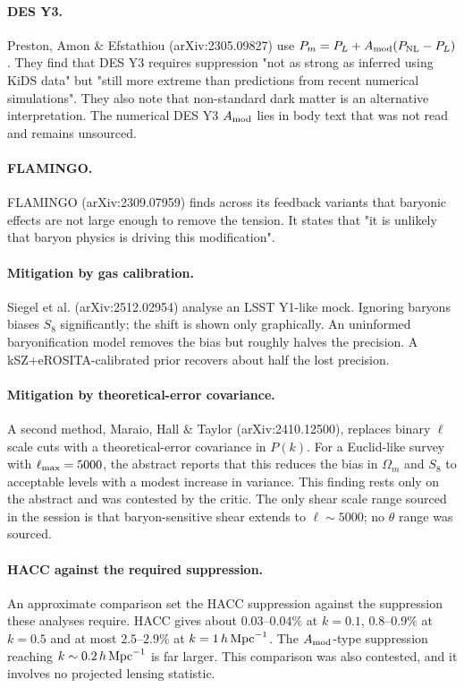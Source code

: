 \documentclass[11pt,a4paper]{article}
\begin{document}
\paragraph{DES Y3.} Preston, Amon \& Efstathiou (arXiv:2305.09827) use $P_m=P_L+A_{\rm mod}(P_{\rm NL}-P_L)$. They find that DES Y3 requires suppression "not as strong as inferred using KiDS data" but "still more extreme than predictions from recent numerical simulations". They also note that non-standard dark matter is an alternative interpretation. The numerical DES Y3 $A_{\rm mod}$ lies in body text that was not read and remains unsourced.

\paragraph{FLAMINGO.} FLAMINGO (arXiv:2309.07959) finds across its feedback variants that baryonic effects are not large enough to remove the tension. It states that "it is unlikely that baryon physics is driving this modification".

\paragraph{Mitigation by gas calibration.} Siegel et al. (arXiv:2512.02954) analyse an LSST Y1-like mock. Ignoring baryons biases $S_8$ significantly; the shift is shown only graphically. An uninformed baryonification model removes the bias but roughly halves the precision. A kSZ+eROSITA-calibrated prior recovers about half the lost precision.

\paragraph{Mitigation by theoretical-error covariance.} A second method, Maraio, Hall \& Taylor (arXiv:2410.12500), replaces binary $\ell$ scale cuts with a theoretical-error covariance in $P(k)$. For a Euclid-like survey with $\ell_{\rm max}=5000$, the abstract reports that this reduces the bias in $\Omega_m$ and $S_8$ to acceptable levels with a modest increase in variance. This finding rests only on the abstract and was contested by the critic. The only shear scale range sourced in the session is that baryon-sensitive shear extends to $\ell\sim5000$; no $\theta$ range was sourced.

\paragraph{HACC against the required suppression.} An approximate comparison set the HACC suppression against the suppression these analyses require. HACC gives about $0.03$--$0.04\%$ at $k=0.1$, $0.8$--$0.9\%$ at $k=0.5$ and at most $2.5$--$2.9\%$ at $k=1\,h\,{\rm Mpc}^{-1}$. The $A_{\rm mod}$-type suppression reaching $k\sim0.2\,h\,{\rm Mpc}^{-1}$ is far larger. This comparison was also contested, and it involves no projected lensing statistic.
\end{document}
